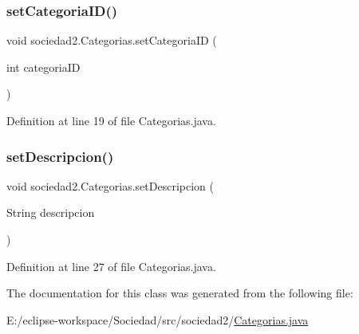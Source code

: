 \subsubsection{\texorpdfstring{set\+Categoria\+I\+D()}{setCategoriaID()}}
{\footnotesize\ttfamily void sociedad2.\+Categorias.\+set\+Categoria\+ID (\begin{DoxyParamCaption}\item[{int}]{categoria\+ID }\end{DoxyParamCaption})}



Definition at line 19 of file Categorias.\+java.

\mbox{\label{classsociedad2_1_1_categorias_aaf348086b5d36288cae11b38837941f8}} 
\subsubsection{\texorpdfstring{set\+Descripcion()}{setDescripcion()}}
{\footnotesize\ttfamily void sociedad2.\+Categorias.\+set\+Descripcion (\begin{DoxyParamCaption}\item[{String}]{descripcion }\end{DoxyParamCaption})}



Definition at line 27 of file Categorias.\+java.



The documentation for this class was generated from the following file\+:\begin{DoxyCompactItemize}
\item 
E\+:/eclipse-\/workspace/\+Sociedad/src/sociedad2/\mbox{\hyperlink{_categorias_8java}{Categorias.\+java}}\end{DoxyCompactItemize}

